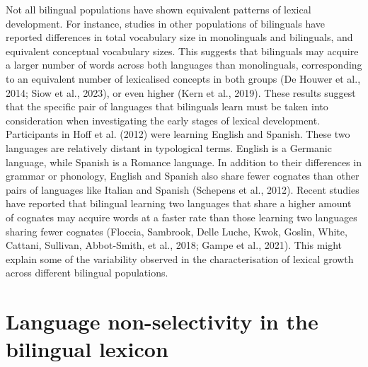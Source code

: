 \documentclass[
  12pt,
  b5paperpaper,
  twoside]{scrreprt}
\begin{document}
Not all bilingual populations have shown equivalent patterns of lexical
development. For instance, studies in other populations of bilinguals
have reported differences in total vocabulary size in monolinguals and
bilinguals, and equivalent conceptual vocabulary sizes. This suggests
that bilinguals may acquire a larger number of words across both
languages than monolinguals, corresponding to an equivalent number of
lexicalised concepts in both groups (De Houwer et al., 2014; Siow et
al., 2023), or even higher (Kern et al., 2019). These results suggest
that the specific pair of languages that bilinguals learn must be taken
into consideration when investigating the early stages of lexical
development. Participants in Hoff et al. (2012) were learning English
and Spanish. These two languages are relatively distant in typological
terms. English is a Germanic language, while Spanish is a Romance
language. In addition to their differences in grammar or phonology,
English and Spanish also share fewer cognates than other pairs of
languages like Italian and Spanish (Schepens et al., 2012). Recent
studies have reported that bilingual learning two languages that share a
higher amount of cognates may acquire words at a faster rate than those
learning two languages sharing fewer cognates (Floccia, Sambrook, Delle
Luche, Kwok, Goslin, White, Cattani, Sullivan, Abbot‐Smith, et al.,
2018; Gampe et al., 2021). This might explain some of the variability
observed in the characterisation of lexical growth across different
bilingual populations.

\hypertarget{language-non-selectivity-in-the-bilingual-lexicon}{%
\section{Language non-selectivity in the bilingual
lexicon}\label{language-non-selectivity-in-the-bilingual-lexicon}}
\end{document}
